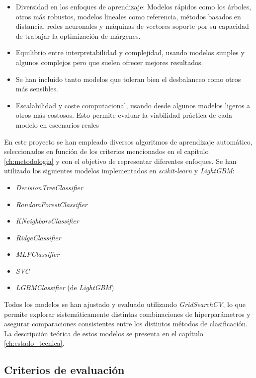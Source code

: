 \begin{itemize}
	\item Diversidad en los enfoques de aprendizaje: Modelos rápidos como los árboles, otros más robustos, modelos lineales como referencia, métodos basados en distancia, redes neuronales y máquinas de vectores soporte por su capacidad de trabajar la optimización de márgenes.
	\item Equilibrio entre interpretabilidad y complejidad, usando modelos simples y algunos complejos pero que suelen ofrecer mejores resultados.
	\item Se han incluido tanto modelos que toleran bien el desbalanceo como otros más sensibles.
	\item Escalabilidad y coste computacional, usando desde algunos modelos ligeros a otros más costosos. Esto permite evaluar la viabilidad práctica de cada modelo en escenarios reales
\end{itemize}

\newpage
En este proyecto se han empleado diversos algoritmos de aprendizaje automático, seleccionados en función de los criterios mencionados en el capitulo \ref{ch:metodologia} y con el objetivo de representar diferentes enfoques. Se han utilizado los siguientes modelos implementados en \textit{scikit-learn} y \textit{LightGBM}:

\begin{spacing}{1}
	\begin{itemize}
		\item \textit{DecisionTreeClassifier}
		\item \textit{RandomForestClassifier}
		\item \textit{KNeighborsClassifier}
		\item \textit{RidgeClassifier}
		\item \textit{MLPClassifier}
		\item \textit{SVC}
		\item \textit{LGBMClassifier} (de \textit{LightGBM})
	\end{itemize}
\end{spacing}
Todos los modelos se han ajustado y evaluado utilizando \textit{GridSearchCV}, lo que permite explorar sistemáticamente distintas combinaciones de hiperparámetros y asegurar comparaciones consistentes entre los distintos métodos de clasificación. La descripción teórica de estos modelos se presenta en el capítulo \ref{ch:estado_tecnica}.

\subsection{Criterios de evaluación}
\label{subsec:evaluacion}

